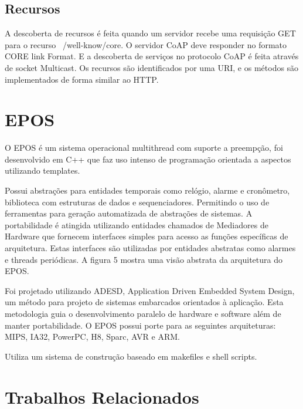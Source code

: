 \subsection{Recursos}
A descoberta de recursos \'e feita quando um servidor recebe uma requisi\c{c}\~ao GET para o recurso ~/well-know/core. O servidor CoAP deve responder no formato CORE link Format.\cite{rfc6690} E a descoberta de servi\c{c}os no protocolo CoAP \'e feita atrav\'es de socket Multicast. Os recursos s\~ao identificados por uma URI, e os m\'etodos s\~ao implementados de forma similar ao HTTP.



\section{EPOS}
O EPOS \'e um sistema operacional multithread com suporte a preemp\c{c}\~ao, foi desenvolvido em C++ que faz uso intenso de programa\c{c}\~ao orientada a aspectos utilizando templates.

Possui abstra\c{c}\~oes para entidades temporais como rel\'ogio, alarme e cron\^ometro, biblioteca com estruturas de dados e sequenciadores. Permitindo o uso de ferramentas para gera\c{c}\~ao automatizada de abstra\c{c}\~oes de sistemas. A portabilidade \'e atingida utilizando entidades chamados de Mediadores de Hardware que fornecem interfaces simples para acesso as fun\c{c}\~oes espec\'ificas de arquitetura. Estas interfaces s\~ao utilizadas por entidades abstratas como alarmes e threads peri\'odicas. A figura 5 mostra uma vis\~ao abstrata da arquitetura do EPOS.


Foi projetado utilizando ADESD, Application Driven Embedded System Design, um m\'etodo para projeto de sistemas embarcados orientados \`a aplica\c{c}\~ao. Esta metodologia guia o desenvolvimento paralelo de hardware e software al\'em de manter portabilidade. O EPOS possui porte para as seguintes arquiteturas: MIPS, IA32, PowerPC, H8, Sparc, AVR e ARM. \cite{epos}

Utiliza um sistema de constru\c{c}\~ao baseado em makefiles e shell scripts.

\section{Trabalhos Relacionados}

